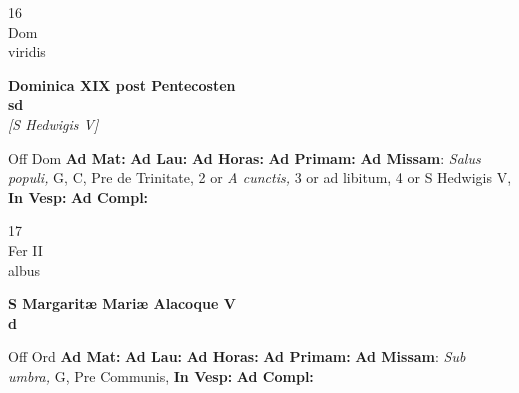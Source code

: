 \documentclass[10pt, openany]{book}
\begin{document}
    \begin{center}
        \begin{minipage}{3.5in}
            \vspace{2em}
            \begin{minipage}{0.5in}
                {\Huge 16} \\
                {\normalsize Dom} \\
                {\normalsize viridis}
            \end{minipage}
            \begin{minipage}{3.0in}
                \textbf{ \large Dominica XIX post Pentecosten \\
                \textnormal{\normalsize sd}} \\ \textit{[S Hedwigis V]} \\ 
            \end{minipage}
            \begin{justify}Off Dom
                \textbf{Ad Mat: }
                \textbf{Ad Lau: }
                \textbf{Ad Horas: }
                \textbf{Ad Primam: }\textbf{Ad Missam}: \textit{Salus populi,} G, C, Pre de Trinitate, 2 or \textit{A cunctis,} 3 or ad libitum, 4 or S Hedwigis V,  
                \textbf{In Vesp: }
                \textbf{Ad Compl: }
            \end{justify}
        \end{minipage}
    \end{center}

    \begin{center}
        \begin{minipage}{3.5in}
            \vspace{2em}
            \begin{minipage}{0.5in}
                {\Huge 17} \\
                {\normalsize Fer II} \\
                {\normalsize albus}
            \end{minipage}
            \begin{minipage}{3.0in}
                \textbf{ \large S Margaritæ Mariæ Alacoque V \\
                \textnormal{\normalsize d}} \\ 
            \end{minipage}
            \begin{justify}Off Ord
                \textbf{Ad Mat: }
                \textbf{Ad Lau: }
                \textbf{Ad Horas: }
                \textbf{Ad Primam: }\textbf{Ad Missam}: \textit{Sub umbra,} G, Pre Communis,  
                \textbf{In Vesp: }
                \textbf{Ad Compl: }
            \end{justify}
        \end{minipage}
    \end{center}
\end{document}
